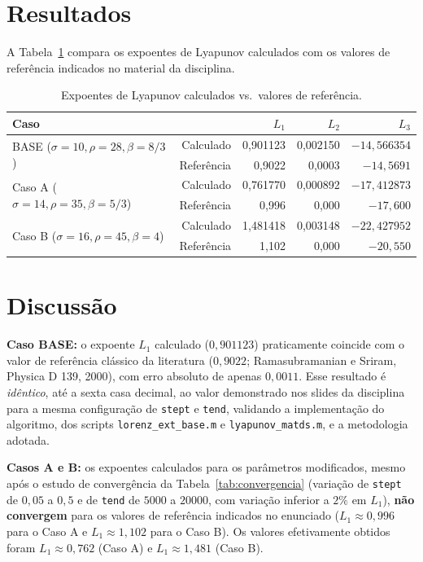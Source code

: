 \documentclass[a4paper,11pt]{article}
\begin{document}
\section{Resultados}

A Tabela~\ref{tab:resultados3} compara os expoentes de Lyapunov
calculados com os valores de referência indicados no material da
disciplina.

\begin{table}[h]
\centering
\caption{Expoentes de Lyapunov calculados vs.\ valores de referência.}
\label{tab:resultados3}
\begin{tabular}{lrrrr}
\toprule
\textbf{Caso} & & \textbf{$L_1$} & \textbf{$L_2$} & \textbf{$L_3$} \\
\midrule
\multirow{2}{*}{BASE ($\sigma{=}10,\rho{=}28,\beta{=}8/3$)}
 & Calculado    & 0,901123 & 0,002150 & $-14{,}566354$ \\
 & Referência   & 0,9022   & 0,0003   & $-14{,}5691$   \\
\midrule
\multirow{2}{*}{Caso A ($\sigma{=}14,\rho{=}35,\beta{=}5/3$)}
 & Calculado    & 0,761770 & 0,000892 & $-17{,}412873$ \\
 & Referência   & 0,996    & 0,000    & $-17{,}600$     \\
\midrule
\multirow{2}{*}{Caso B ($\sigma{=}16,\rho{=}45,\beta{=}4$)}
 & Calculado    & 1,481418 & 0,003148 & $-22{,}427952$ \\
 & Referência   & 1,102    & 0,000    & $-20{,}550$     \\
\bottomrule
\end{tabular}
\end{table}

\section{Discussão}

\textbf{Caso BASE:} o expoente $L_1$ calculado ($0{,}901123$) praticamente
coincide com o valor de referência clássico da literatura
($0{,}9022$; Ramasubramanian e Sriram, Physica D 139, 2000), com erro
absoluto de apenas $0{,}0011$. Esse resultado é \emph{idêntico}, até a
sexta casa decimal, ao valor demonstrado nos slides da disciplina para
a mesma configuração de \texttt{stept} e \texttt{tend}, validando a
implementação do algoritmo, dos scripts \texttt{lorenz\_ext\_base.m} e
\texttt{lyapunov\_matds.m}, e a metodologia adotada.

\textbf{Casos A e B:} os expoentes calculados para os parâmetros
modificados, mesmo após o estudo de convergência da
Tabela~\ref{tab:convergencia} (variação de \texttt{stept} de $0{,}05$ a $0{,}5$ e de
\texttt{tend} de $5000$ a $20000$, com variação inferior a $2\%$ em
$L_1$), \textbf{não convergem} para os valores de referência indicados
no enunciado ($L_1\approx0{,}996$ para o Caso A e $L_1\approx1{,}102$
para o Caso B). Os valores efetivamente obtidos foram
$L_1\approx0{,}762$ (Caso A) e $L_1\approx1{,}481$ (Caso B).
\end{document}
